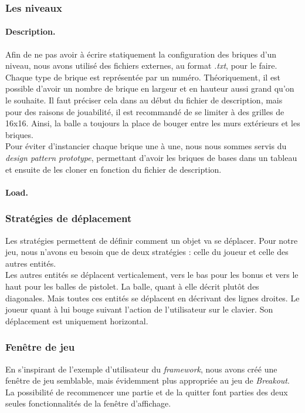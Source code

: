 \documentclass[a4paper,10pt]{article}
\begin{document}
    \subsubsection{Les niveaux}
    
        \paragraph{Description. }Afin de ne pas avoir à écrire statiquement la configuration des briques d'un niveau, nous avons
        utilisé des fichiers externes, au format \textit{.txt}, pour le faire. Chaque type de brique est représentée par un numéro.
        Théoriquement, il est possible d'avoir un nombre de brique en largeur et en hauteur aussi grand qu'on le souhaite.
        Il faut préciser cela dans au début du fichier de description, mais pour des raisons de jouabilité, il
        est recommandé de se limiter à des grilles de 16x16. Ainsi, la balle a toujours la place de bouger entre les murs
        extérieurs et les briques. \\

        Pour éviter d'instancier chaque brique une à une, nous nous sommes servis du \textit{design pattern prototype},
        permettant d'avoir les briques de bases dans un tableau et ensuite de les cloner en fonction du
        fichier de description.
        
        \paragraph{Load.} %

    \subsubsection{Stratégies de déplacement}
        Les stratégies permettent de définir comment un objet va se déplacer. Pour notre jeu, nous n'avons eu besoin
        que de deux stratégies  : celle du joueur et celle des autres entités. \\ Les autres entités
        se déplacent verticalement, vers le bas pour les bonus et vers le haut pour les balles de pistolet. La balle, quant
        à elle décrit plutôt des diagonales. Mais toutes ces entités se déplacent en décrivant des lignes droites.
        Le joueur quant à lui bouge suivant l'action de l'utilisateur sur le clavier. Son déplacement est uniquement horizontal.

    \subsubsection{Fenêtre de jeu}
        En s'inspirant de l'exemple d'utilisateur du \textit{framework}, nous avons créé une fenêtre de jeu semblable,
        mais évidemment plus appropriée au jeu de \textit{Breakout}. La possibilité de recommencer une partie et de la quitter
        font parties des deux seules fonctionnalités de la fenêtre d'affichage. \\
\end{document}
